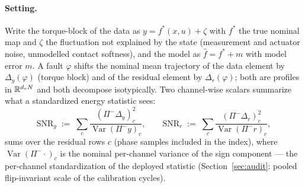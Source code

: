 \paragraph{Setting.}
Write the torque-block of the data as $y = f^{*}(x,u) + \zeta$ with $f^{*}$
the true nominal map and $\zeta$ the fluctuation not explained by the state
(measurement and actuator noise, unmodelled contact softness), and the model
as $\hat f = f^{*} + m$ with model error $m$. A fault $\varphi$ shifts the
nominal mean trajectory of the data element by $\Delta_y(\varphi)$ (torque
block) and of the residual element by $\Delta_r(\varphi)$; both are profiles
in $\mathbb{R}^{d_r N}$ and both decompose isotypically. Two channel-wise scalars
summarize what a standardized energy statistic sees:
\begin{equation}
  \label{eq:snr}
  \mathrm{SNR}_y \;:=\; \sum_{c} \frac{(\Pi^{-}\Delta_y)_c^{2}}{\operatorname{Var}(\Pi^{-}y)_c},
  \qquad
  \mathrm{SNR}_r \;:=\; \sum_{c} \frac{(\Pi^{-}\Delta_r)_c^{2}}{\operatorname{Var}(\Pi^{-}r)_c},
\end{equation}
sums over the residual rows $c$ (phase samples included in the index), where
$\operatorname{Var}(\Pi^{-}\cdot)_c$ is the nominal per-channel variance of
the sign component --- the per-channel standardization of the deployed
statistic (Section~\ref{sec:audit}: pooled flip-invariant scale of the
calibration cycles).

